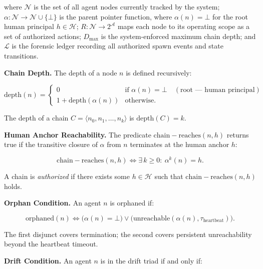 where $\mathcal{N}$ is the set of all agent nodes currently tracked by the system; $\alpha: \mathcal{N} \rightarrow \mathcal{N} \cup \{\bot\}$ is the parent pointer function, where $\alpha(n) = \bot$ for the root human principal $h \in \mathcal{H}$; $R: \mathcal{N} \rightarrow 2^{\mathcal{A}}$ maps each node to its operating scope as a set of authorized actions; $D_{\max}$ is the system-enforced maximum chain depth; and $\mathcal{L}$ is the forensic ledger recording all authorized spawn events and state transitions.

\medskip
\noindent\textbf{Chain Depth.}
The depth of a node $n$ is defined recursively:

\begin{equation}
\mathrm{depth}(n) = 
\begin{cases}
0 & \text{if } \alpha(n) = \bot \quad (\text{root — human principal}) \\
1 + \mathrm{depth}(\alpha(n)) & \text{otherwise}.
\end{cases}
\label{eq:rs-depth}
\end{equation}

The depth of a chain $C = \langle n_0, n_1, \ldots, n_k \rangle$ is $\mathrm{depth}(C) = k$.

\medskip
\noindent\textbf{Human Anchor Reachability.}
The predicate $\mathrm{chain-reaches}(n, h)$ returns true if the transitive closure of $\alpha$ from $n$ terminates at the human anchor $h$:

\begin{equation}
\mathrm{chain-reaches}(n, h) \iff \exists\, k \geq 0:\ \alpha^{k}(n) = h.
\label{eq:rs-chain-reaches}
\end{equation}

A chain is \emph{authorized} if there exists some $h \in \mathcal{H}$ such that $\mathrm{chain-reaches}(n, h)$ holds.

\medskip
\noindent\textbf{Orphan Condition.}
An agent $n$ is orphaned if:

\begin{equation}
\mathrm{orphaned}(n) \iff \bigl( \alpha(n) = \bot \bigr) \lor \bigl( \mathrm{unreachable}(\alpha(n), \tau_{\mathrm{heartbeat}}) \bigr).
\label{eq:rs-orphaned}
\end{equation}

The first disjunct covers termination; the second covers persistent unreachability beyond the heartbeat timeout.

\medskip
\noindent\textbf{Drift Condition.}
An agent $n$ is in the drift triad if and only if:

